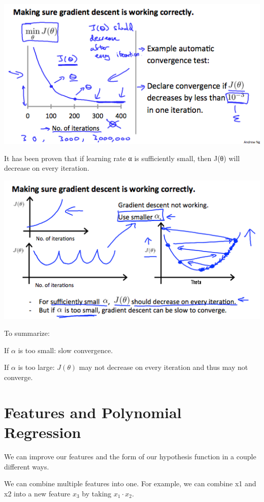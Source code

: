 \documentclass[10pt,a4paper,UTF8]{article}
\begin{document}
\begin{center}
\includegraphics[width=.9\linewidth]{../../img/computer_ng/20171006costFunctionofIteration.png}
\end{center}

It has been proven that if learning rate α is sufficiently small, then J(θ) will decrease on every iteration.

\begin{center}
\includegraphics[width=.9\linewidth]{../../img/computer_ng/20171006costFunctionofIteration2.png}
\end{center}

To summarize:

If \(\alpha\) is too small: slow convergence.

If \(\alpha\) is too large: \(J(\theta)\) may not decrease on every iteration and thus may not converge.
\section{Features and Polynomial Regression}
\label{sec:orgf08b2ed}


We can improve our features and the form of our hypothesis function in a couple different ways.

We can combine multiple features into one. For example, we can combine x1 and x2 into a new feature \(x_{3}\) by taking \(x_{1}\cdot x_{2}\).
\end{document}
